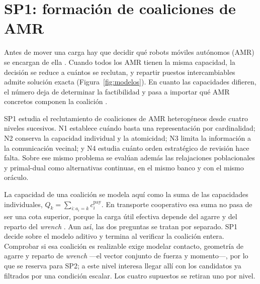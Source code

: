 \documentclass[12pt,a4paper]{article}
\theoremstyle{remark}
\theoremstyle{plain}
\begin{document}
\viuromanfoliofalse
{}
\setcounter{page}{1}

\section{SP1: formación de coaliciones de AMR}

Antes de mover una carga hay que decidir qué robots móviles autónomos (AMR) se
encargan de ella \citep{gerkeyMataric2004MRTA,korsahStentzDias2013iTax}. Cuando
todos los AMR tienen la misma capacidad, la decisión se reduce a cuántos se
reclutan, y repartir puestos intercambiables admite solución exacta
(Figura~\ref{fig:modelos}). En cuanto las capacidades difieren, el número deja de
determinar la factibilidad y pasa a importar qué AMR concretos componen la
coalición \citep{zhang2024coalition}.

SP1 estudia el reclutamiento de coaliciones de AMR heterogéneos desde cuatro
niveles sucesivos. N1 establece cuándo basta una representación por cardinalidad;
N2 conserva la capacidad individual y la atomicidad; N3 limita la información a
la comunicación vecinal; y N4 estudia cuánto orden estratégico de revisión hace
falta. Sobre ese mismo problema se evalúan además las relajaciones poblacionales
y primal-dual como alternativas continuas, en el mismo banco y con el mismo
oráculo.

La capacidad de una coalición se modela aquí como la suma de las capacidades
individuales, $Q_k=\sum_{i:a_i=k}c_i^{\mathrm{pay}}$. En transporte cooperativo esa
suma no pasa de ser una cota superior, porque la carga útil efectiva depende del
agarre y del reparto del \emph{wrench} \citep{an2023cooperativeReview}. Aun así, las dos preguntas se tratan por
separado. SP1 decide sobre el modelo aditivo y termina al verificar la coalición
entera. Comprobar si esa coalición es realizable exige modelar contacto, geometría de
agarre y reparto de \emph{wrench} ---el vector conjunto de fuerza y momento---,
por lo que se reserva para SP2; a este nivel interesa llegar allí con los
candidatos ya filtrados por una condición escalar. Los cuatro supuestos se retiran uno por
nivel.
\end{document}
